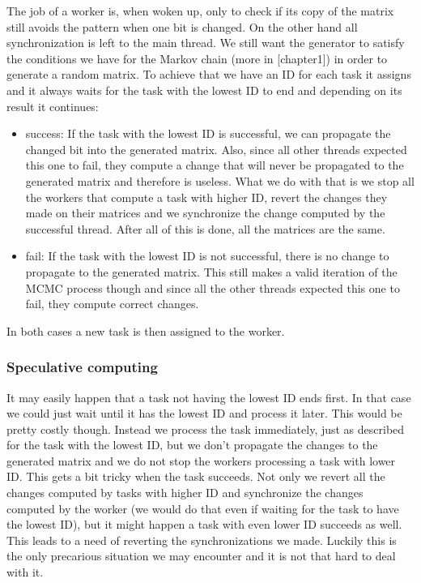 The job of a worker is, when woken up, only to check if its copy of the matrix still avoids the pattern when one bit is changed. On the other hand all synchronization is left to the main thread. We still want the generator to satisfy the conditions we have for the Markov chain (more in [chapter1]) in order to generate a random matrix. To achieve that we have an ID for each task it assigns and it always waits for the task with the lowest ID to end and depending on its result it continues:
\begin{itemize}
\item success: If the task with the lowest ID is successful, we can propagate the changed bit into the generated matrix. Also, since all other threads expected this one to fail, they compute a change that will never be propagated to the generated matrix and therefore is useless. What we do with that is we stop all the workers that compute a task with higher ID, revert the changes they made on their matrices and we synchronize the change computed by the successful thread. After all of this is done, all the matrices are the same.
\item fail: If the task with the lowest ID is not successful, there is no change to propagate to the generated matrix. This still makes a valid iteration of the MCMC process though and since all the other threads expected this one to fail, they compute correct changes.
\end{itemize}
In both cases a new task is then assigned to the worker.

\subsubsection{Speculative computing}
It may easily happen that a task not having the lowest ID ends first. In that case we could just wait until it has the lowest ID and process it later. This would be pretty costly though. Instead we process the task immediately, just as described for the task with the lowest ID, but we don't propagate the changes to the generated matrix and we do not stop the workers processing a task with lower ID. This gets a bit tricky when the task succeeds. Not only we revert all the changes computed by tasks with higher ID and synchronize the changes computed by the worker (we would do that even if waiting for the task to have the lowest ID), but it might happen a task with even lower ID succeeds as well. This leads to a need of reverting the synchronizations we made. Luckily this is the only precarious situation we may encounter and it is not that hard to deal with it.

